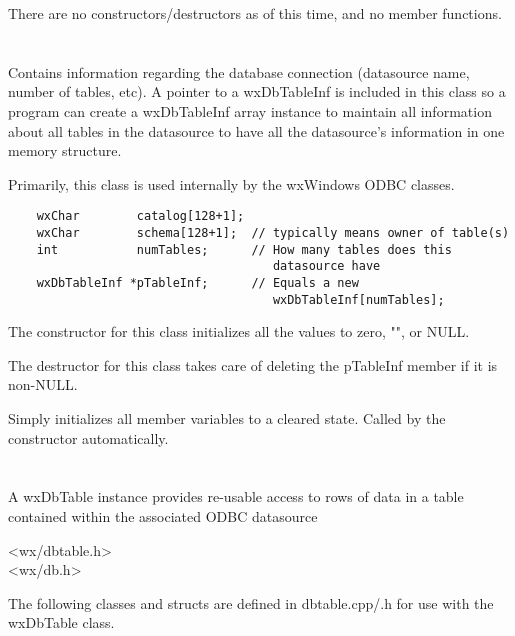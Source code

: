 There are no constructors/destructors as of this time, and no member functions.


\section{}\label{wxdbinf}

Contains information regarding the database connection (datasource name, 
number of tables, etc).  A pointer to a wxDbTableInf is included in this 
class so a program can create a wxDbTableInf array instance to maintain all
information about all tables in the datasource to have all the datasource's
information in one memory structure.

Primarily, this class is used internally by the wxWindows ODBC classes.

\begin{verbatim}
    wxChar        catalog[128+1];
    wxChar        schema[128+1];  // typically means owner of table(s)
    int           numTables;      // How many tables does this 
                                     datasource have
    wxDbTableInf *pTableInf;      // Equals a new 
                                     wxDbTableInf[numTables];
\end{verbatim}

The constructor for this class initializes all the values to zero, "", or NULL.

The destructor for this class takes care of deleting the pTableInf member if 
it is non-NULL.

\label{wxdbinfinitialize}

Simply initializes all member variables to a cleared state.  Called by 
the constructor automatically.


\section{}\label{wxdbtable}

A wxDbTable instance provides re-usable access to rows of data in
a table contained within the associated ODBC datasource


<wx/dbtable.h>\\
<wx/db.h>


The following classes and structs are defined in dbtable.cpp/.h for use 
with the wxDbTable class.


